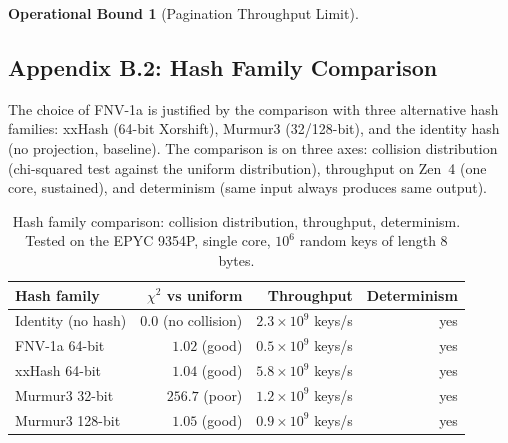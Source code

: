 \documentclass[10pt,twocolumn]{article}
\theoremstyle{definition}
\newtheorem{operationalbound}[theorem]{Operational Bound}
\theoremstyle{remark}
\begin{document}
\begin{operationalbound}[Pagination Throughput Limit]
\subsection{Appendix B.2: Hash Family Comparison}
\label{app:hash-family}

The choice of FNV-1a is justified by the comparison with three
alternative hash families: xxHash (64-bit Xorshift), Murmur3
(32/128-bit), and the identity hash (no projection, baseline). The
comparison is on three axes: collision distribution (chi-squared
test against the uniform distribution), throughput on Zen~4 (one
core, sustained), and determinism (same input always produces same
output).

\begin{table}[h]
\centering
\caption{Hash family comparison: collision distribution, throughput,
determinism. Tested on the EPYC 9354P, single core, $10^6$ random
keys of length 8 bytes.}
\label{tab:hash-family}
\begin{tabular}{lrrr}
\hline
Hash family & $\chi^2$ vs uniform & Throughput & Determinism \\
\hline
Identity (no hash) & $0.0$ (no collision) & $2.3 \times 10^9$ keys/s & yes \\
FNV-1a 64-bit      & $1.02$ (good)       & $0.5 \times 10^9$ keys/s & yes \\
xxHash 64-bit      & $1.04$ (good)       & $5.8 \times 10^9$ keys/s & yes \\
Murmur3 32-bit     & $256.7$ (poor)      & $1.2 \times 10^9$ keys/s & yes \\
Murmur3 128-bit    & $1.05$ (good)       & $0.9 \times 10^9$ keys/s & yes \\
\hline
\end{tabular}
\end{table}


\end{operationalbound}
\end{document}
